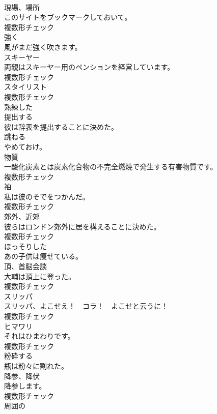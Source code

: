 \documentclass[8pt]{extreport}
\begin{document}
\begin{CJK}{UTF8}{min}
\\	[名詞]	現場、場所	
\\	このサイトをブックマークしておいて。	
\\	複数形チェック
\\	[副詞]	強く	
\\	風がまだ強く吹きます。	
\\	[名詞]	スキーヤー	
\\	両親はスキーヤー用のペンションを経営しています。	
\\	複数形チェック
\\	[名詞]	スタイリスト	
\\	複数形チェック
\\	[形容詞]	熟練した	
\\	[動詞]	提出する	
\\	彼は辞表を提出することに決めた。	
\\	[動詞]	跳ねる	
\\	やめておけ。	
\\	[名詞]	物質	
\\	一酸化炭素とは炭素化合物の不完全燃焼で発生する有害物質です。	
\\	複数形チェック
\\	[名詞]	袖	
\\	私は彼のそでをつかんだ。	
\\	複数形チェック
\\	[名詞]	郊外、近郊	
\\	彼らはロンドン郊外に居を構えることに決めた。	
\\	複数形チェック
\\	[形容詞]	ほっそりした	
\\	あの子供は痩せている。	
\\	[名詞]	頂、首脳会談	
\\	大輔は頂上に登った。	
\\	複数形チェック
\\	[名詞]	スリッパ	
\\	スリッパ、よこせえ！　コラ！　よこせと云うに！	
\\	複数形チェック
\\	[名詞]	ヒマワリ	
\\	それはひまわりです。	
\\	複数形チェック
\\	[動詞]	粉砕する	
\\	瓶は粉々に割れた。	
\\	[名詞]	降参、降伏	
\\	降参します。	
\\	複数形チェック
\\	[形容詞]	周囲の	

\end{CJK}
\end{document}

